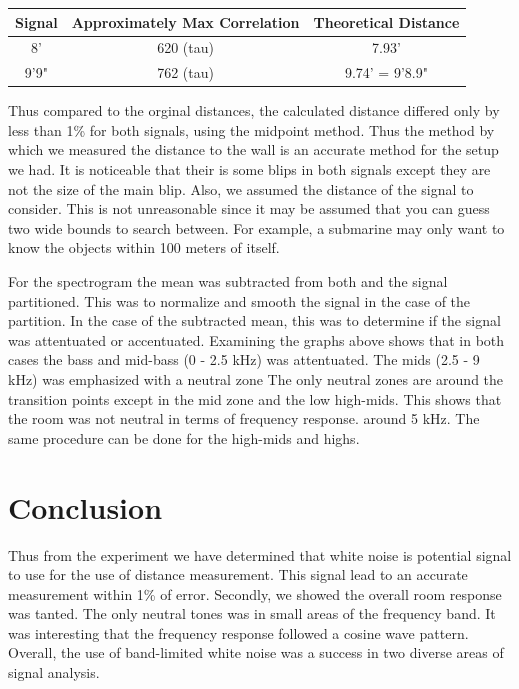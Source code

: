 \documentclass{article}
\begin{document}
      \begin{tabular}{|c|c|c|}
         \hline
         Signal & Approximately Max Correlation & Theoretical Distance \\
         \hline
         8' & 620 (tau) & 7.93'\\
         9'9" & 762 (tau) & 9.74' = 9'8.9"\\
         \hline
      \end{tabular}

      Thus compared to the orginal distances, the calculated distance differed
      only by less than 1\% for both signals, using the midpoint method. Thus
      the method by which we measured the distance to the wall is an accurate
      method for the setup we had. It is noticeable that their is some blips
      in both signals except they are not the size of the main blip. Also, we
      assumed the distance of the signal to consider. This is not unreasonable
      since it may be assumed that you can guess two wide bounds to search
      between. For example, a submarine may only want to know the objects within
      100 meters of itself.

      For the spectrogram the mean was subtracted from both and the signal
      partitioned. This was to normalize and smooth the signal in the case
      of the partition. In the case of the subtracted mean, this was to
      determine if the signal was attentuated or accentuated. Examining the
      graphs above shows that in both cases the bass and mid-bass (0 - 2.5 kHz)
      was attentuated. The mids (2.5 - 9 kHz) was emphasized with a neutral zone
      The only neutral zones are around the transition points except in the
      mid zone and the low high-mids. This shows that the room was not
      neutral in terms of frequency response.
      around 5 kHz. The same procedure can be done for the high-mids and highs. 

   \section{Conclusion}
      Thus from the experiment we have determined that white noise is
      potential signal to use for the use of distance measurement. This
      signal lead to an accurate measurement within 1\% of error. Secondly,
      we showed the overall room response was tanted. The only neutral tones
      was in small areas of the frequency band. It was interesting that the
      frequency response followed a cosine wave pattern. Overall, the use of
      band-limited white noise was a success in two diverse areas of
      signal analysis.
\end{document}
